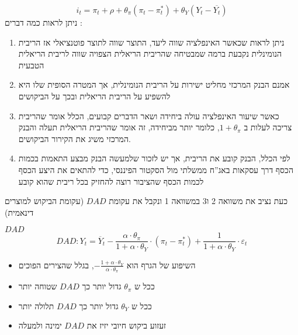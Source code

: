 \documentclass[10pt,usenames,dvipsnames]{beamer}
\begin{document}
\begin{RTL}
\begin{frame}[allowframebreaks]
    \framebreak
    $$i_t = \pi_t + \rho +\theta_\pi \left(\pi_t - \pi^*_t\right) + \theta_Y \left(Y_t - \overline{Y_t}\right)$$
    ניתן לראות כמה דברים :
    \begin{enumerate}
        \item ניתן לראות שכאשר האינפלציה שווה ליעד, התוצר שווה לתוצר פוטנציאלי אז הריבית הנומינלית נקבעת ברמה שמבטיחה שהריבית הריאלית הצפויה שווה לריבית הריאלית הטבעית
        \item אמנם הבנק המרכזי מחליט ישירות על הריבית הנומינלית, אך המטרה הסופית שלו היא להשפיע על הריבית הריאלית ובכך על הביקושים
        \item כאשר שיעור האינפלציה עולה ביחידה ושאר הדברים קבועים, הכלל אומר שהריבית צריכה לעלות ב $1 + \theta_\pi$, כלומר יותר מביחידה, זה אומר שהריבית הריאלית תעלה והבנק המרכזי משיג את הקירור הביקושים.
        \item לפי הכלל, הבנק קובע את הריבית, אך יש לזכור שלמעשה הבנק מבצע התאמות בכמות הכסף דרך עסקאות באג''ח ממשלתי מול הסקטור הפיננסי, כדי להתאים את היצע הכסף לכמות הכסף שהציבור רוצה להחזיק בכל ריבית שהוא קובע
    \end{enumerate}

    \framebreak
    כעת נציב את משוואה 2 ו3 במשוואה 1 ונקבל את עקומת $DAD$ (עקומת הביקוש למוצרים דינאמית)
    \begin{block}{$DAD$}
        $$
D A D: Y_t=\overline{Y}_t-\frac{\alpha \cdot \theta_\pi}{1+\alpha \cdot \theta_Y} \cdot\left(\pi_t-\pi_t^*\right)+\frac{1}{1+\alpha \cdot \theta_Y} \cdot \varepsilon_t
$$
        \begin{itemize}
            \item השיפוע של הגרף הוא $-\frac{1 + \alpha \cdot \theta_Y}{\alpha \cdot \theta_\pi}$, בגלל שהצירים הפוכים
            \item ככל ש $\theta_\pi$ גדול יותר כך $DAD$ שטוחה יותר
            \item ככל ש $\theta_Y$ גדול יותר כך $DAD$ תלולה יותר
            \item זעזוע ביקוש חיובי יזיז את $DAD$ ימינה ולמעלה
        \end{itemize}
        
    \end{block}
    

\end{frame}


\end{RTL}
\end{document}
